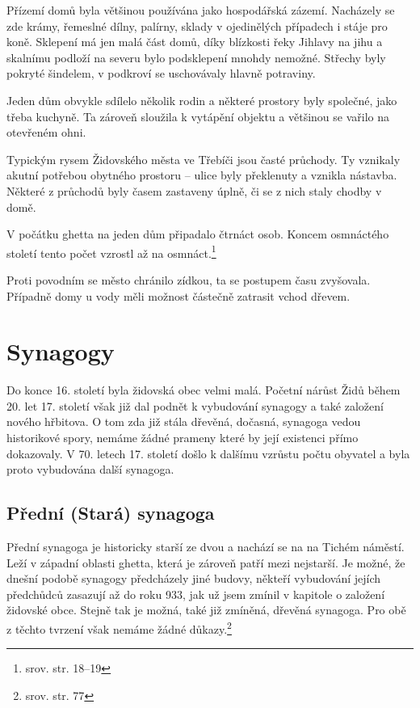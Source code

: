 \documentclass[a4paper,oneside,12pt]{report}
\begin{document}
Přízemí domů byla většinou používána jako hospodářská zázemí.
Nacházely se zde krámy, řemeslné dílny, palírny, sklady v ojedinělých případech i stáje pro koně.
Sklepení má jen malá část domů, díky blízkosti řeky Jihlavy na jihu a skalnímu podloží na severu bylo podsklepení mnohdy nemožné.
Střechy byly pokryté šindelem, v podkroví se uschovávaly hlavně potraviny.

Jeden dům obvykle sdílelo několik rodin a některé prostory byly společné, jako třeba kuchyně.
Ta zároveň sloužila k vytápění objektu a většinou se vařilo na otevřeném ohni.

Typickým rysem Židovského města ve Třebíči jsou časté průchody.
Ty vznikaly akutní potřebou obytného prostoru -- ulice byly překlenuty a vznikla nástavba.
Některé z průchodů byly časem zastaveny úplně, či se z nich staly chodby v domě.

V počátku ghetta na jeden dům připadalo čtrnáct osob.
Koncem osmnáctého století tento počet vzrostl až na osmnáct.\footnote{srov.  str. 18--19}

Proti povodním se město chránilo zídkou, ta se postupem času zvyšovala.
Případně domy u vody měli možnost částečně zatrasit vchod dřevem.

\section{Synagogy}

Do konce 16. století byla židovská obec velmi malá.
Početní nárůst Židů během 20. let 17. století však již dal podnět k vybudování synagogy a také založení nového hřbitova.
O tom zda již stála dřevěná, dočasná, synagoga vedou historikové spory, nemáme žádné prameny které by její existenci přímo dokazovaly.
V 70. letech 17. století došlo k dalšímu vzrůstu počtu obyvatel a byla proto vybudována další synagoga.

\subsection{Přední (Stará) synagoga}

Přední synagoga je historicky starší ze dvou a nachází se na na Tichém náměstí.
Leží v západní oblasti ghetta, která je zároveň patří mezi nejstarší.
Je možné, že dnešní podobě synagogy předcházely jiné budovy, někteří vybudování jejích předchůdců zasazují až do roku 933, jak už jsem zmínil v kapitole o založení židovské obce.
Stejně tak je možná, také již zmíněná, dřevěná synagoga.
Pro obě z těchto tvrzení však nemáme žádné důkazy.\footnote{srov. \cite{Fiser2005} str. 77}
\end{document}
